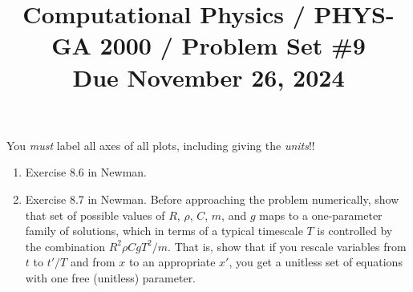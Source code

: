 \documentclass[11pt, preprint]{aastex}
\begin{document}
\title{\bf Computational Physics / PHYS-GA 2000 / Problem Set \#9
\\ Due November 26, 2024 }

You {\it must} label all axes of all plots, including giving the {\it
  units}!!

\begin{enumerate} 
\item Exercise 8.6 in Newman. 
\item Exercise 8.7 in Newman. Before approaching the problem
  numerically, show that set of possible values of $R$, $\rho$, $C$,
  $m$, and $g$ maps to a one-parameter family of solutions, which in
  terms of a typical timescale $T$ is controlled by the combination
  $R^2\rho C g T^2/m$. That is, show that if you rescale variables
  from $t$ to $t'/T$ and from $x$ to an appropriate $x'$, you get a
  unitless set of equations with one free (unitless) parameter.
\end{enumerate} 
\end{document}
